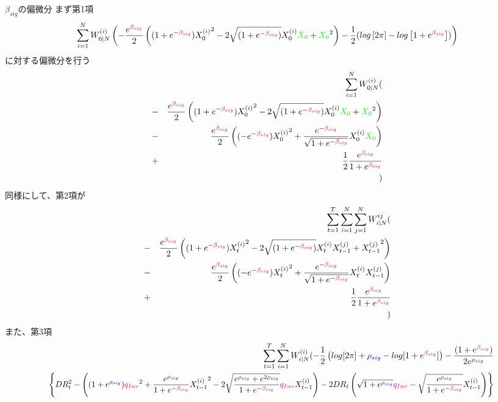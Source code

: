 \documentclass[a4j,11pt]{jarticle}
\makeatletter
\def\subsection{\@startsection{subsection}{1}{\z@}
   {0\Cvs \@plus.5\Cdp \@minus.2\Cdp}
   {0.01\Cvs \@plus.3\Cdp}
   {\normalfont \normalsize \bfseries}}
\makeatother
\begin{document}
\subsection{$\beta_{sig}$の偏微分}
まず第1項
$$
\sum_{i=1}^NW_{0|N}^{(i)} \left(-\frac{e^{\textcolor{red}{\beta_{sig}}}}{2}\left((1+e^{-\textcolor{red}{\beta_{sig}}}){X_0^{(i)}}^2 -2\sqrt{(1+e^{-\textcolor{red}{\beta_{sig}}})}X_0^{(i)}\textcolor{green}{X_0} + \textcolor{green}{X_0}^2 \right)-\frac{1}{2}(log\left[2\pi\right] - log\left[1 + e^{\textcolor{red}{\beta_{sig}}}\right])\right)
$$
に対する偏微分を行う
\begin{eqnarray}
&&\sum_{i=1}^NW_{0|N}^{(i)}(\nonumber\\
&-&\frac{e^{\textcolor{red}{\beta_{sig}}}}{2}\left((1+e^{-\textcolor{red}{\beta_{sig}}}){X_0^{(i)}}^2 -2\sqrt{(1+e^{-\textcolor{red}{\beta_{sig}}})}X_0^{(i)}\textcolor{green}{X_0} + \textcolor{green}{X_0}^2 \right)\nonumber\\
&-&\frac{e^{\textcolor{red}{\beta_{sig}}}}{2}\left((-e^{-\textcolor{red}{\beta_{sig}}}){X_0^{(i)}}^2 +\frac{e^{-\textcolor{red}{\beta_{sig}}}}{\sqrt{1+e^{-\textcolor{red}{\beta_{sig}}}}}X_0^{(i)}\textcolor{green}{X_0} \right)\nonumber\\
&+&\frac{1}{2}\frac{e^{\textcolor{red}{\beta_{sig}}}}{1+e^{\textcolor{red}{\beta_{sig}}}}\nonumber\\
&&)
\end{eqnarray}
同様にして、第2項が
\begin{eqnarray}
&&\sum_{t=1}^{T}\sum_{i=1}^{N}\sum_{j=1}^{N}W_{i|N}^{ij}(\nonumber\\
&-&\frac{e^{\textcolor{red}{\beta_{sig}}}}{2}\left((1+e^{-\textcolor{red}{\beta_{sig}}}){X_t^{(i)}}^2 -2\sqrt{(1+e^{-\textcolor{red}{\beta_{sig}}})}X_t^{(i)}{X_{t-1}^{(j)}} + {X_{t-1}^{(j)}}^2 \right)\nonumber\\
&-&\frac{e^{\textcolor{red}{\beta_{sig}}}}{2}\left((-e^{-\textcolor{red}{\beta_{sig}}}){X_t^{(i)}}^2 +\frac{e^{-\textcolor{red}{\beta_{sig}}}}{\sqrt{1+e^{-\textcolor{red}{\beta_{sig}}}}}X_t^{(i)}{X_{t-1}^{(j)}} \right)\nonumber\\
&+&\frac{1}{2}\frac{e^{\textcolor{red}{\beta_{sig}}}}{1+e^{\textcolor{red}{\beta_{sig}}}}\nonumber\\
&&)
\end{eqnarray}
また、第3項
\begin{eqnarray*}
&&\sum_{t=1}^{T}\sum_{i=1}^{N}W_{i|N}^{(i)}
(-\frac{1}{2} \left(log[2\pi] + \textcolor{blue}{\rho_{sig}} - log[1+e^{\textcolor{red}{\beta_{sig}}}]\right)
-\frac{(1+e^{\textcolor{red}{\beta_{sig}}})}{2e^{\textcolor{blue}{\rho_{sig}}}}\\
&&
\scalebox{0.95}{$\displaystyle
\left\{DR_t^2-
\left((1+ e^{\textcolor{blue}{\rho_{sig}}} ) \textcolor{magenta}{q_{Inv}}^2+\frac{e^{\textcolor{blue}{\rho_{sig}}}}{1+e^{-\textcolor{red}{\beta_{sig}}}}{X_{t-1}^{(i)}}^2 - 2 \sqrt{\frac{e^{\textcolor{blue}{\rho_{sig}}} + e^{2\textcolor{blue}{\rho_{sig}}} }{1+e^{-\textcolor{red}{\beta_{sig}}}} }\textcolor{magenta}{q_{Inv}}X_{t-1}^{(i)}\right)
 - 2DR_t
\left(\sqrt{1+e^{\textcolor{blue}{\rho_{sig}}}} \textcolor{magenta}{q_{Inv}}-\sqrt{\frac{e^{\textcolor{blue}{\rho_{sig}}}}{1+e^{-\textcolor{red}{\beta_{sig}}}}}X_{t-1}^{(i)}\right)
 \right\}
$}
\end{eqnarray*}
\end{document}
